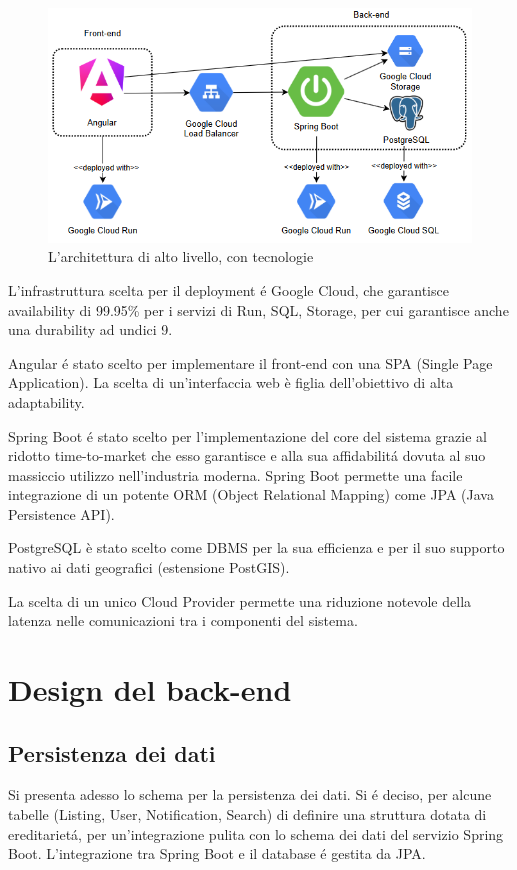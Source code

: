 \begin{figure}[H]
    \centering
    \includegraphics[width=\textwidth]{assets/diagrams/high-level-arch-tecnologies.png}
    \caption{L'architettura di alto livello, con tecnologie}
    \label{fig:Architettura di alto livello, con tecnologie}
\end{figure}

L'infrastruttura scelta per il deployment é Google Cloud, che garantisce availability 
di 99.95\% per i servizi di Run, SQL, Storage, per cui garantisce anche una durability 
ad undici 9.

Angular é stato scelto per implementare il front-end con una SPA (Single Page 
Application). La scelta di un'interfaccia web è figlia dell'obiettivo di alta 
adaptability.

Spring Boot é stato scelto per l'implementazione del core del sistema grazie al ridotto 
time-to-market che esso garantisce e alla sua affidabilitá dovuta al suo massiccio 
utilizzo nell'industria moderna. Spring Boot permette una facile integrazione di un 
potente ORM (Object Relational Mapping) come JPA (Java Persistence API).

PostgreSQL è stato scelto come DBMS per la sua efficienza e per il suo supporto nativo 
ai dati geografici (estensione PostGIS).

La scelta di un unico Cloud Provider permette una riduzione notevole della latenza nelle 
comunicazioni tra i componenti del sistema.

\section{Design del back-end}

\subsection{Persistenza dei dati}
Si presenta adesso lo schema per la persistenza dei dati.
Si é deciso, per alcune tabelle (Listing, User, Notification, Search) di definire
una struttura dotata di ereditarietá, per un'integrazione pulita con lo schema dei dati
del servizio Spring Boot. L'integrazione tra Spring Boot e il database é gestita da JPA.

